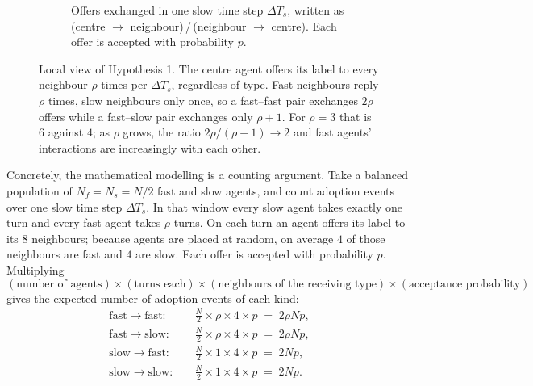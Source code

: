\documentclass{article}
\newcommand{\dTs}{\Delta T_s}
\begin{document}
\begin{figure}[ht]
\begin{subfigure}[b]{0.58\textwidth}
        \caption{Offers exchanged in one slow time step $\Delta T_s$, written as (centre $\to$ neighbour)\,/\,(neighbour $\to$ centre). Each offer is accepted with probability $p$.}
        \label{fig:h1b}
    \end{subfigure}
    \caption{Local view of Hypothesis 1. The centre agent offers its label to every neighbour $\rho$ times per $\Delta T_s$, regardless of type. Fast neighbours reply $\rho$ times, slow neighbours only once, so a fast--fast pair exchanges $2\rho$ offers while a fast--slow pair exchanges only $\rho+1$. For $\rho = 3$ that is $6$ against $4$; as $\rho$ grows, the ratio $2\rho/(\rho+1) \to 2$ and fast agents' interactions are increasingly with each other.}
    \label{fig:h1}
\end{figure}

Concretely, the mathematical modelling is a counting argument. Take a balanced population of $N_f = N_s = N/2$ fast and slow agents, and count adoption events over one slow time step $\dTs$. In that window every slow agent takes exactly one turn and every fast agent takes $\rho$ turns. On each turn an agent offers its label to its $8$ neighbours; because agents are placed at random, on average $4$ of those neighbours are fast and $4$ are slow. Each offer is accepted with probability $p$. Multiplying
\[
(\text{number of agents}) \times (\text{turns each}) \times (\text{neighbours of the receiving type}) \times (\text{acceptance probability})
\]
gives the expected number of adoption events of each kind:
\begin{align*}
\text{fast} \to \text{fast}: &\quad \tfrac{N}{2} \times \rho \times 4 \times p \;=\; 2\rho N p, \\
\text{fast} \to \text{slow}: &\quad \tfrac{N}{2} \times \rho \times 4 \times p \;=\; 2\rho N p, \\
\text{slow} \to \text{fast}: &\quad \tfrac{N}{2} \times 1 \times 4 \times p \;=\; 2 N p, \\
\text{slow} \to \text{slow}: &\quad \tfrac{N}{2} \times 1 \times 4 \times p \;=\; 2 N p.
\end{align*}




\end{document}
